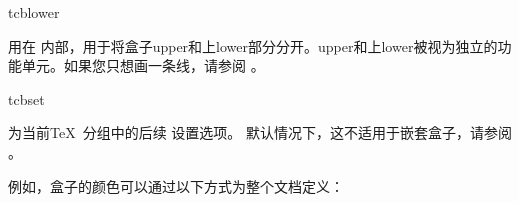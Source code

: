 \begin{docCommand}{tcblower}{}

用在  内部，用于将盒子upper和上lower部分分开。upper和上lower被视为独立的功能单元。如果您只想画一条线，请参阅 。
\end{docCommand}


\begin{docCommand}{tcbset}{}
  
  为当前\TeX\ 分组中的后续  设置选项。
  默认情况下，这不适用于嵌套盒子，请参阅 。



  例如，盒子的颜色可以通过以下方式为整个文档定义：
\begin{dispListing}
\end{dispListing}
\end{docCommand}


